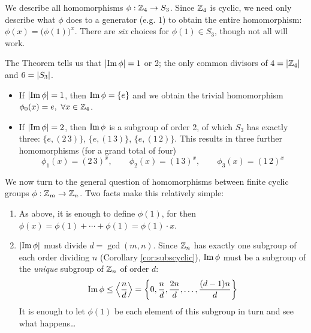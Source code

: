 \begin{example}{}{}
% 
	  We describe all homomorphisms $\phi:\mathbb{Z}_4\to S_3$.\smallbreak
	  Since $\mathbb{Z}_4$ is cyclic, we need only describe what $\phi$ does to a generator (e.g. 1) to obtain the entire homomorphism: $\phi(x)=\bigl(\phi(1)\bigr)^x$. There are \emph{six} choices for $\phi(1)\in S_3$, though not all will work.\smallbreak
	  
	  The Theorem tells us that $\left| \operatorname{Im}\phi\right|=1$ or 2; the only common divisors of $4=\left| \mathbb{Z}_4\right|$ and $6=\left| S_3\right|$.
	  \begin{itemize}
	    \item If $\left| \operatorname{Im}\phi\right|=1$, then $\operatorname{Im}\phi=\{e\}$ and we obtain the trivial homomorphism $\phi_0(x)=e,\ \forall x\in\mathbb{Z}_4$.
	    \item If $\left| \operatorname{Im}\phi\right|=2$, then $\operatorname{Im}\phi$ is a subgroup of order 2, of which $S_3$ has exactly three: $\{e,(2\,3)\}$, $\{e,(1\,3)\}$, $\{e,(1\,2)\}$. This results in three further homomorphisms (for a grand total of four)
	  \[
	  	\phi_1(x)=(2\,3)^x,\qquad 
	  	\phi_2(x)=(1\,3)^x,\qquad
	  	\phi_3(x)=(1\,2)^x
	  \]
	  \end{itemize}
\end{example}


\goodbreak


We now turn to the general question of homomorphisms between finite cyclic groups $\phi:\mathbb{Z}_m\to\mathbb{Z}_n$. Two facts make this relatively simple:
\begin{enumerate}
  \item As above, it is enough to define $\phi(1)$, for then $\phi(x)=\phi(1)+\cdots+\phi(1)=\phi(1)\cdot x$.
  \item $\left| \operatorname{Im}\phi\right|$ must divide $d=\gcd(m,n)$. Since $\mathbb{Z}_n$ has exactly one subgroup of each order dividing $n$ (Corollary \ref{cor:subscyclic}), $\operatorname{Im}\phi$ must be a subgroup of the \emph{unique} subgroup of $\mathbb{Z}_n$ of order $d$:
	\[
		\operatorname{Im}\phi\le\left\langle \frac nd\right\rangle
		=\left\{0,\frac nd,\frac{2n}d,\ldots,\frac{(d-1)n}d\right\}
	\]
	It is enough to let $\phi(1)$ be each element of this subgroup in turn and see what happens\ldots
\end{enumerate} 

